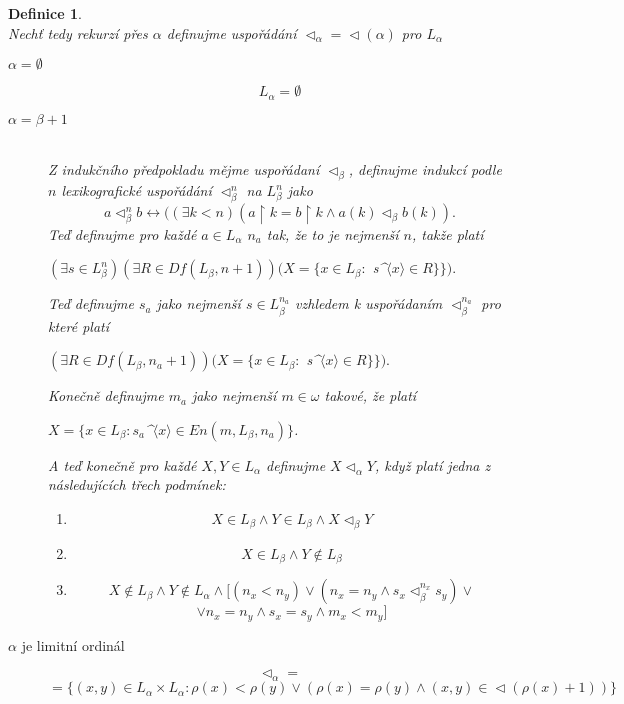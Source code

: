 \documentclass[12pt,a4paper]{article}
\newtheorem{definice}[veta]{Definice}
\begin{document}
\begin{definice}~\\
Nech\v{t} tedy rekurz\'{i} p\v{r}es $ \alpha $ definujme uspo\v{r}\'{a}d\'{a}n\'{i} $ \vartriangleleft_\alpha=\vartriangleleft(\alpha)$ pro $ L_\alpha $
\begin{description}
  \item[$ \alpha=\emptyset $] 
  \[  L_\alpha = \emptyset \]
  \item[$ \alpha=\beta+1 $]~\\
  Z induk\v{c}n\'{i}ho p\v{r}edpokladu m\v{e}jme uspo\v{r}\'{a}dan\'{i} $ \vartriangleleft_\beta $, definujme indukc\'{i} podle $ n $ lexikografick\'{e} uspo\v{r}\'{a}d\'{a}n\'{i} $\vartriangleleft_\beta^n $ na $ {L}_{\beta}^n $ jako
\[ a \vartriangleleft_\beta^n b \leftrightarrow ((\exists k< n) ( a \upharpoonright k = b \upharpoonright k \wedge a(k)  \vartriangleleft_\beta  b(k) ).\]
\newpage
Te\v{d} definujme pro ka\v{z}d\'{e} $ a \in L_\alpha $ $n_a $ tak, \v{z}e to je nejmen\v{s}\'{i} $ n $, tak\v{z}e plat\'{i}\begin{center}
$  (\exists s \in L_\beta^n)(\exists R \in Df(L_\beta,n+1)) (X=\{ x \in L_\beta: $  s\textasciicircum  $ \langle x \rangle \in R \}  \} ).  $
\end{center}
Te\v{d} definujme $ s_a $ jako nejmen\v{s}\'{i} $ s \in L_\beta^{n_a} $ vzhledem k  uspo\v{r}\'{a}dan\'{i}m $ \vartriangleleft_\beta^{n_a} $ pro kter\'{e} plat\'{i} 
\begin{center}
$(\exists R \in Df(L_\beta,n_a+1)) (X=\{ x \in L_\beta: $  s\textasciicircum  $ \langle x \rangle \in R \}  \} ).  $ \
\end{center}
Kone\v{c}n\v{e} definujme $ m_a $ jako nejmen\v{s}\'{i} $ m \in \omega $ takov\'{e}, \v{z}e plat\'{i}
\begin{center}
$ X=\{ x \in L_\beta: s_a$\textasciicircum  $ \langle x \rangle \in En(m,L_\beta,n_a) \}  $.
\end{center}
A te\v{d} kone\v{c}n\v{e} pro ka\v{z}d\'{e} $ X,Y \in L_\alpha $ definujme $X \vartriangleleft_\alpha Y$, kdy\v{z} plat\'{i} jedna z n\'{a}sleduj\'{i}c\'{i}ch t\v{r}ech podm\'{i}nek:
\begin{enumerate}
  \item \[ X \in L_\beta \wedge Y \in L_\beta \wedge X \vartriangleleft_\beta Y \]
  \item \[ X \in L_\beta \wedge Y \notin  L_\beta \]
  \item \[ X \notin L_\beta \wedge Y \notin  L_\alpha \wedge [(n_x<n_y) \vee (n_x=n_y \wedge s_x\vartriangleleft_\beta^{n_x}s_y) \vee\] \[\vee n_x=n_y \wedge s_x=s_y \wedge m_x<m_y]\]
\end{enumerate}
\item[$ \alpha  $ je limitn\'{i} ordin\'{a}l] 
\[ \vartriangleleft_\alpha = \] \[ = \{(x,y) \in L_\alpha \times L_\alpha : \rho(x)<\rho(y) \vee (\rho(x)=\rho(y) \wedge (x,y) \in \vartriangleleft(\rho(x)+1)) \} \]
\end{description}
\label{def:orda}
\end{definice}
\end{document}
